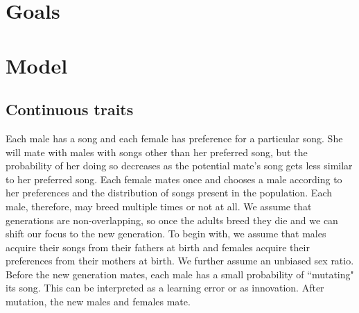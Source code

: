 \documentclass{article}\usepackage[]{graphicx}\usepackage[]{color}
\begin{document}
\section{Goals}

\section{Model}

\subsection{Continuous traits }

Each male has a song and each female has preference for a particular song. She will mate with males with songs other than her preferred song, but the probability of her doing so decreases as the potential mate's song gets less similar to her preferred song. Each female mates once and chooses a male according to her preferences and the distribution of songs present in the population. Each male, therefore, may breed multiple times or not at all. We assume that generations are non-overlapping, so once the adults breed they die and we can shift our focus to the new generation. To begin with, we assume that males acquire their songs from their fathers at birth and females acquire their preferences from their mothers at birth. We further assume an unbiased sex ratio. Before the new generation mates, each male has a small probability of ``mutating" its song. This can be interpreted as a learning error or as innovation. After mutation, the new males and females mate. 
\end{document}
